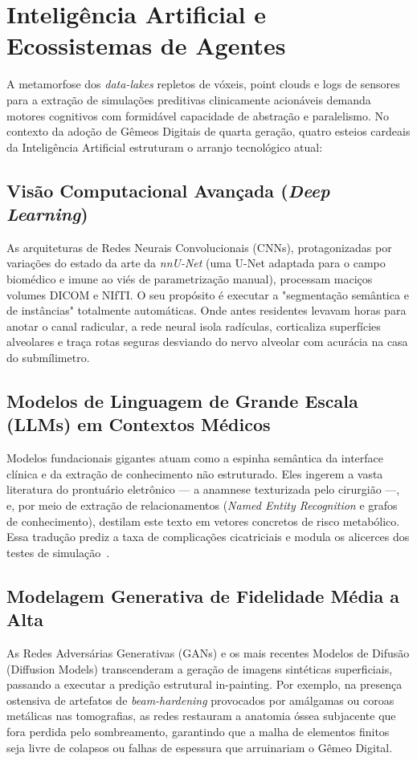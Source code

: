 \section{Inteligência Artificial e Ecossistemas de Agentes}

A metamorfose dos \textit{data-lakes} repletos de vóxeis, point clouds e logs de sensores para a extração de simulações preditivas clinicamente acionáveis demanda motores cognitivos com formidável capacidade de abstração e paralelismo. No contexto da adoção de Gêmeos Digitais de quarta geração, quatro esteios cardeais da Inteligência Artificial estruturam o arranjo tecnológico atual:

\subsection{Visão Computacional Avançada (\textit{Deep Learning})}
As arquiteturas de Redes Neurais Convolucionais (CNNs), protagonizadas por variações do estado da arte da \textit{nnU-Net} (uma U-Net adaptada para o campo biomédico e imune ao viés de parametrização manual), processam maciços volumes DICOM e NIfTI. O seu propósito é executar a "segmentação semântica e de instâncias" totalmente automáticas. Onde antes residentes levavam horas para anotar o canal radicular, a rede neural isola radículas, corticaliza superfícies alveolares e traça rotas seguras desviando do nervo alveolar com acurácia na casa do submílimetro.

\subsection{Modelos de Linguagem de Grande Escala (LLMs) em Contextos Médicos}
Modelos fundacionais gigantes atuam como a espinha semântica da interface clínica e da extração de conhecimento não estruturado. Eles ingerem a vasta literatura do prontuário eletrônico — a anamnese texturizada pelo cirurgião —, e, por meio de extração de relacionamentos (\textit{Named Entity Recognition} e grafos de conhecimento), destilam este texto em vetores concretos de risco metabólico. Essa tradução prediz a taxa de complicações cicatriciais e modula os alicerces dos testes de simulação~\cite{mdpi2025digital}.

\subsection{Modelagem Generativa de Fidelidade Média a Alta}
As Redes Adversárias Generativas (GANs) e os mais recentes Modelos de Difusão (Diffusion Models) transcenderam a geração de imagens sintéticas superficiais, passando a executar a predição estrutural in-painting. Por exemplo, na presença ostensiva de artefatos de \textit{beam-hardening} provocados por amálgamas ou coroas metálicas nas tomografias, as redes restauram a anatomia óssea subjacente que fora perdida pelo sombreamento, garantindo que a malha de elementos finitos seja livre de colapsos ou falhas de espessura que arruinariam o Gêmeo Digital.

